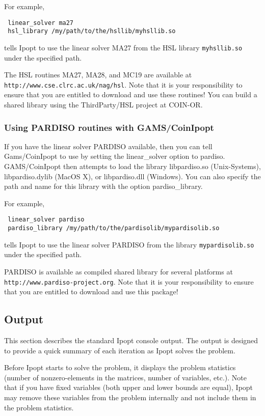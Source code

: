 For example,
\begin{verbatim}
 linear_solver ma27
 hsl_library /my/path/to/the/hsllib/myhsllib.so
\end{verbatim}
tells Ipopt to use the linear solver MA27 from the HSL library \verb=myhsllib.so= under the specified path.

The HSL routines MA27, MA28, and MC19 are available at \texttt{http://www.cse.clrc.ac.uk/nag/hsl}.
Note that it is your responsibility to ensure that you are entitled to download and use these routines!
You can build a shared library using the ThirdParty/HSL project at COIN-OR.

\subsubsection{Using PARDISO routines with GAMS/CoinIpopt}

If you have the linear solver PARDISO available, then you can tell Gams/CoinIpopt to use by setting the linear\_solver option to pardiso.
GAMS/CoinIpopt then attempts to load the library libpardiso.so (Unix-Systems), libpardiso.dylib (MacOS X), or libpardiso.dll (Windows).
You can also specify the path and name for this library with the option pardiso\_library.

For example,
\begin{verbatim}
 linear_solver pardiso
 pardiso_library /my/path/to/the/pardisolib/mypardisolib.so
\end{verbatim}
tells Ipopt to use the linear solver PARDISO from the library \verb=mypardisolib.so= under the specified path.

PARDISO is available as compiled shared library for several platforms at \texttt{http://www.pardiso-project.org}.
Note that it is your responsibility to ensure that you are entitled to download and use this package!

\subsection{Output}

This section describes the standard Ipopt console output.
The output is designed to provide a quick summary of each iteration as Ipopt solves the problem.

Before Ipopt starts to solve the problem, it displays the problem statistics (number of nonzero-elements in the matrices, number of variables, etc.).
Note that if you have fixed variables (both upper and lower bounds are equal), Ipopt may remove these variables from the problem internally and not include them in the problem statistics.

